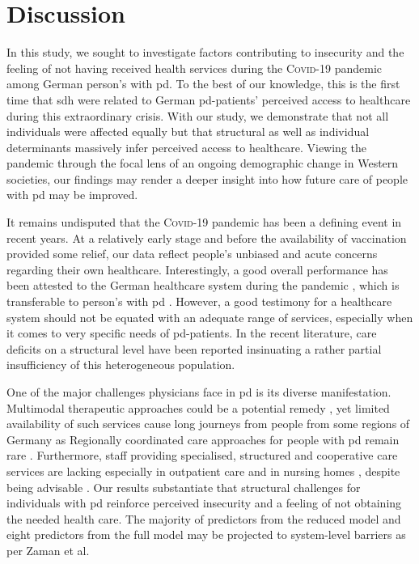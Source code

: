 \documentclass{bmcart}
\begin{document}
\newpage

\section*{Discussion}

In this study, we sought to investigate factors contributing to insecurity and the feeling of not having received health services during the \textsc{Covid}-19 pandemic among German person's with \ac{pd}. To the best of our knowledge, this is the first time that \ac{sdh} were related to German \ac{pd}-patients' perceived access to healthcare during this extraordinary crisis. With our study, we demonstrate that not all individuals were affected equally but that structural as well as individual determinants massively infer perceived access to healthcare. Viewing the pandemic through the focal lens of an ongoing demographic change in Western societies, our findings may render a deeper insight into how future care of people with \ac{pd} may be improved. 

It remains undisputed that the \textsc{Covid}-19 pandemic has been a defining event in recent years. At a relatively early stage and before the availability of vaccination provided some relief, our data reflect people's unbiased and acute concerns regarding their own healthcare. Interestingly, a good overall performance has been attested to the German healthcare system during the pandemic \cite{10665-341674}, which is transferable to person's with \ac{pd} \cite{frundt2022impact}. However, a good testimony for a healthcare system should not be equated with an adequate range of services, especially when it comes to very specific needs of \ac{pd}-patients. In the recent literature, care deficits on a structural level have been reported insinuating a rather partial insufficiency \cite{richter2019dynamics,van2020building, prell2020specialized, deuschl2016s3} of this heterogeneous population.

One of the major challenges physicians face in \ac{pd} is its diverse manifestation. Multimodal therapeutic approaches could be a potential remedy \cite{richter2019dynamics}, yet limited availability of such services cause long journeys from people from some regions of Germany \cite{richter2019dynamics} as Regionally coordinated care approaches for people with \ac{pd} remain rare \cite{van2020building}. Furthermore, staff providing specialised, structured and cooperative care services are lacking especially in outpatient care and in nursing homes \cite{prell2020specialized}, despite being advisable \cite{radder2020recommendations, deuschl2016s3}. Our results substantiate that structural challenges for individuals with \ac{pd} reinforce perceived insecurity and a feeling of not obtaining the needed health care. The majority of predictors from the reduced model and eight predictors from the full model may be projected to system-level barriers as per Zaman et al.  
\end{document}
